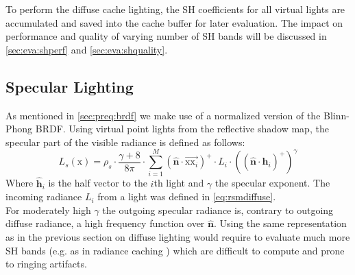 \documentclass[thesis.tex]{subfiles}
\begin{document}
To perform the diffuse cache lighting, the SH coefficients for all virtual lights are accumulated and saved into the cache buffer for later evaluation.
The impact on performance and quality of varying number of SH bands will be discussed in \autoref{sec:eva:shperf} and \autoref{sec:eva:shquality}.

\subsection{Specular Lighting} \label{sec:impl:specenvmap}
As mentioned in \autoref{sec:preq:brdf} we make use of a normalized version of the Blinn-Phong BRDF.
Using virtual point lights from the reflective shadow map, the specular part of the visible radiance is defined as follows:
\begin{equation}
L_s (\mathrm{x}) = \rho_s \cdot \frac{\gamma + 8}{8\pi} \cdot \sum\limits_{i=1}^{M}
(\hat{\mathbf{n}}\cdot \overrightarrow{\mathrm{x}\mathrm{x}_i})^+ \cdot L_i \cdot ((\hat{\mathbf{n}} \cdot \hat{\mathbf{h}}_i)^+)^\gamma
\end{equation}
Where $\hat{\mathbf{h}}_i$ is the half vector to the $i$th light and $\gamma$ the specular exponent.
The incoming radiance $L_i$ from a light was defined in \autoref{eq:rsmdiffuse}.
\\
For moderately high $\gamma$ the outgoing specular radiance is, contrary to outgoing diffuse radiance, a high frequency function over $\hat{\mathbf{n}}$.
Using the same representation as in the previous section on diffuse lighting would require to evaluate much more SH bands (e.g. as in radiance caching \cite{bib:radiancecaching}) which are difficult to compute and prone to ringing artifacts.
\end{document}
